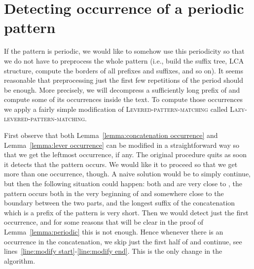 \documentclass[runningheads]{llncs}
\newcommand{\proc}[1]{\textnormal{\scshape#1}}
\begin{document}
\section{Detecting occurrence of a periodic pattern}
\label{section:periodic}

If the pattern is periodic, we would like to somehow use this periodicity so that we do not have to preprocess the whole pattern (i.e., build the suffix tree, LCA structure, compute the borders of all prefixes and suffixes, and so on). It seems reasonable that preprocessing just the first few repetitions of the period should be enough. More precisely, we will decompress a sufficiently long prefix of  and compute some of its occurrences
inside the text. To compute those occurrences we apply a fairly simple modification of \proc{Levered-pattern-matching} called
\proc{Lazy-levered-pattern-matching}. 

First observe that both Lemma~\ref{lemma:concatenation occurrence} and Lemma~\ref{lemma:lever occurrence} can be modified in a straightforward way so that we get the leftmost occurrence, if any. The original procedure quits as soon it detects that the pattern occurs. We would like it to proceed
so that we get more than one occurrence, though. A naive solution would be to simply continue, but then the following situation could happen:
both  and  are very close to , the pattern occurs both in the very beginning of  and somewhere close to the boundary between the two parts, and the longest suffix of the concatenation which is a prefix of the pattern is very short. Then we would detect just the first occurrence, and for some reasons that will be clear in the proof of Lemma~\ref{lemma:periodic} this is not enough. Hence whenever there is an occurrence in the concatenation, we skip just the first half of  and continue, see lines~\ref{line:modify start}-\ref{line:modify end}. This is the only change in the algorithm.
\end{document}
